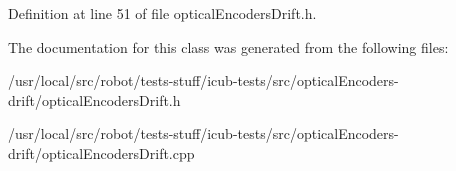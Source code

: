Definition at line 51 of file optical\-Encoders\-Drift.\-h.



The documentation for this class was generated from the following files\-:\begin{DoxyCompactItemize}
\item 
/usr/local/src/robot/tests-\/stuff/icub-\/tests/src/optical\-Encoders-\/drift/optical\-Encoders\-Drift.\-h\item 
/usr/local/src/robot/tests-\/stuff/icub-\/tests/src/optical\-Encoders-\/drift/optical\-Encoders\-Drift.\-cpp\end{DoxyCompactItemize}
